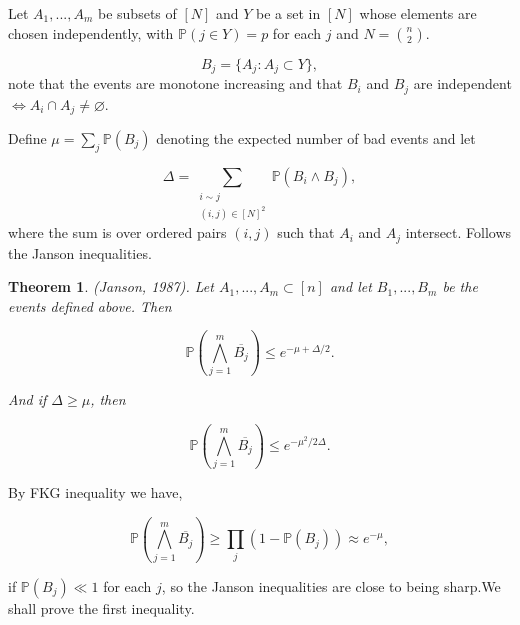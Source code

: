 \documentclass[12pt,twoside,a4paper]{book}
\numberwithin{equation}{section}
\let\emptyset=\varnothing
\newtheorem{theorem}             {Theorem}[section]
\theoremstyle{remark}
\begin{document}
Let $A_1, ... , A_m$ be subsets of $[N]$ and $Y$ be a set in $[N]$ whose elements are chosen independently, with $\mathbb{P}(j \in Y) = p$ for each $j$ and $N=\binom{n}{2}$. 

$$ B_j = \{A_j \colon A_j \subset Y\},$$
note that the events are monotone increasing and that $B_i$ and $B_j$ are independent $\iff A_i \cap A_j \neq \emptyset$. 

Define $\mu = \sum_j \mathbb{P}(B_j)$ denoting the expected number of bad events and let

$$ \Delta = \sum_{\substack{i\sim j\\ (i,j) \in [N]^2}} \mathbb{P}(B_i \wedge B_j), $$
where the sum is over ordered pairs $(i,j)$ such that $A_i$ and $A_j$ intersect. Follows the Janson inequalities.

\begin{theorem}
(Janson, 1987). Let $A_1,...,A_m \subset [n]$ and let $B_1,...,B_m$ be the events defined above. Then

$$ \mathbb{P}\left(\bigwedge_{j=1}^m \overline{B_j}\right) \leq e^{-\mu + \Delta/2}. $$

And if $\Delta \geq \mu$, then

$$ \mathbb{P}\left( \bigwedge_{j=1}^m \overline{B_j} \right) \leq e^{-\mu ^2 /2\Delta}.$$
\end{theorem}
By FKG inequality we have,

$$ \mathbb{P}\left( \bigwedge_{j=1}^m \overline{B_j} \right) \geq \prod_j (1-\mathbb{P}(B_j)) \approx e^{-\mu}, $$

if $\mathbb{P}(B_j) \ll 1$ for each $j$, so the Janson inequalities are close to being sharp.We shall prove the first inequality.
\end{document}
